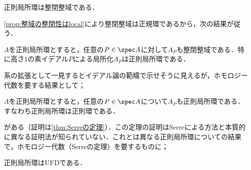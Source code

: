 \begin{cor}\label{cor:正則局所環は整閉整域}
	正則局所環は整閉整域である．
\end{cor}

%

\ref{prop:整域の整閉性はlocal}により整閉整域は正規環であるから，次の結果が従う．

\begin{cor}
	$A$を正則局所環とすると，任意の$P\in\spec A$に対して$A_P$も整閉整域である．特に高さ$1$の素イデアル$P$による局所化$A_P$は正則局所環である．
\end{cor}

系の拡張として一見するとイデアル論の範疇で示せそうに見えるが，ホモロジー代数を要する結果として；

\begin{thm}[Serreの定理]\label{prethm:Serre}
	$A$を正則局所環とすると，任意の$P\in\spec A$について$A_P$も正則局所環である．すなわち正則局所環は正則環である．
\end{thm}

がある（証明は\ref{thm:Serreの定理}）．この定理の証明はSerreによる方法と本質的に異なる証明法が知られていない．これとは異なる正則局所環についての結果で，ホモロジー代数（Serreの定理）を要するものに；

\begin{thm}\label{prethm:Auslander-Buchsbaum}
	正則局所環はUFDである．
\end{thm}

